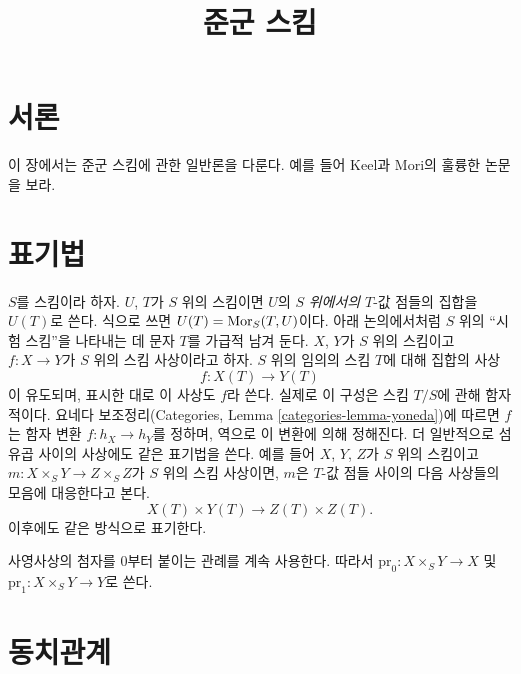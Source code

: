 

%


\title{준군 스킴}


\maketitle

\label{section-phantom}

\tableofcontents

\section{서론}
\label{section-introduction}

\noindent
이 장에서는 준군 스킴에 관한 일반론을 다룬다.
예를 들어 Keel과 Mori의 훌륭한 논문 \cite{K-M}을 보라.





\section{표기법}
\label{section-notation}

\noindent
$S$를 스킴이라 하자. $U$, $T$가 $S$ 위의 스킴이면 $U$의
$S$ {\it 위에서의} $T$-값 점들의 집합을 $U(T)$로 쓴다. 식으로 쓰면
$U(T) = \mathop{\mathrm{Mor}}\nolimits_S(T, U)$이다. 아래 논의에서처럼 $S$ 위의
``시험 스킴''을 나타내는 데 문자 $T$를 가급적 남겨 둔다.
$X$, $Y$가 $S$ 위의 스킴이고 $f : X \to Y$가 $S$ 위의
스킴 사상이라고 하자. $S$ 위의 임의의 스킴 $T$에 대해 집합의 사상
$$
f : X(T) \longrightarrow Y(T)
$$
이 유도되며, 표시한 대로 이 사상도 $f$라 쓴다. 실제로 이 구성은
스킴 $T/S$에 관해 함자적이다. 요네다 보조정리(Categories, Lemma
\ref{categories-lemma-yoneda})에 따르면 $f$는 함자 변환
$f : h_X \to h_Y$를 정하며, 역으로 이 변환에 의해 정해진다.
더 일반적으로 섬유곱 사이의 사상에도 같은 표기법을 쓴다. 예를 들어
$X$, $Y$, $Z$가 $S$ 위의 스킴이고
$m : X \times_S Y \to Z \times_S Z$가
$S$ 위의 스킴 사상이면, $m$은 $T$-값 점들 사이의 다음 사상들의 모음에
대응한다고 본다.
$$
X(T) \times Y(T) \longrightarrow Z(T) \times Z(T).
$$
이후에도 같은 방식으로 표기한다.

\medskip\noindent
사영사상의 첨자를 $0$부터 붙이는 관례를 계속 사용한다. 따라서
$\text{pr}_0 : X \times_S Y \to X$ 및
$\text{pr}_1 : X \times_S Y \to Y$로 쓴다.






\section{동치관계}
\label{section-equivalence-relations}

